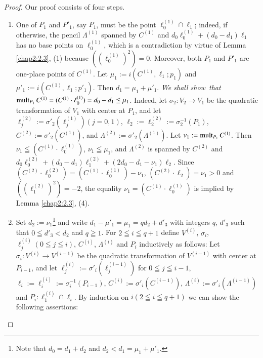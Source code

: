 \begin{proof}
Our proof consists of four steps.
\begin{enumerate}
\renewcommand{\theenumi}{\Roman{enumi}}
\renewcommand{\labelenumi}{\rm(\theenumi)}
\item One of $P_{1}$ and $P'_{1}$, say $P_{1}$, must be the point
  $\ell^{(1)}_{0}\cap \ell_{1}$; indeed, if otherwise, the pencil
  $\Lambda^{(1)}$ spanned by $C^{(1)}$ and
  $d_{0}\ell^{(1)}_{0}+(d_{0}-d_{1})\ell_{1}$ has no base points on
  $\ell^{(1)}_{0}$, which is a contradiction by virtue of Lemma
  \ref{chap2:2.3}, (1) because $((\ell^{(1)}_{0})^{2})=0$. Moreover, both
  $P_{1}$ and $P'_{1}$ are one-place points of $C^{(1)}$. Let
  $\mu_{1}:=i(C^{(1)},\ell_{1};p_{1})$ and
  $\mu'_{1}:=i(C^{(1)},\ell_{1};p'_{1})$. Then
  $d_{1}=\mu_{1}+\mu'_{1}$. {\em We shall show\pageoriginale\ that}
  $\operatorname{mult}_{P_{1}}C^{(1)}=(C^{(1)}\cdot\ell^{(1)}_{0})=d_{0}-d_{1}\leqq
  \mu_{1}$. Indeed, let $\sigma_{2}:V_{2}\to V_{1}$ be the quadratic
  transformation of $V_{1}$ with center at $P_{1}$, and let
  $\ell^{(2)}_{j}:=\sigma'_{2}(\ell^{(1)}_{j})(j=0,1)$,
  $\ell_{2}:=\ell^{(2)}_{2}:=\sigma^{-1}_{2}(P_{1})$,
  $C^{(2)}:=\sigma'_{2}(C^{(1)})$, and
  $\Lambda^{(2)}:=\sigma'_{2}(\Lambda^{(1)})$. Let
  $\nu_{1}:=\operatorname{mult}_{P_{1}}C^{(1)}$. Then $\nu_{1}\leqq
  (C^{(1)}\cdot\ell^{(1)}_{0})$, $\nu_{1}\leqq \mu_{1}$, and
  $\Lambda^{(2)}$ is spanned by $C^{(2)}$ and
  $d_{0}\ell_{0}^{(2)}+(d_{0}-d_{1})\ell^{(2)}_{1}+(2d_{0}-d_{1}-\nu_{1})\ell_{2}$. Since
  $(C^{(2)}\cdot \ell^{(2)}_{0})=(C^{(1)}\cdot
  \ell^{(1)}_{0})-\nu_{1}$, $(C^{(2)}\cdot\ell_{2})=\nu_{1}>0$ and
  $((\ell^{(2)}_{1})^{2})=-2$, the equality $\nu_{1}=(C^{(1)}\cdot
  \ell^{(1)}_{0})$ is implied by Lemma \ref{chap2:2.3}, (4).

\item Set $d_{2}:=\nu_{1}$\footnote{Note that $d_{0}=d_{1}+d_{2}$ and
  $d_{2}<d_{1}=\mu_{1}+\mu'_{1}$.} and write
  $d_{1}-\mu'_{1}=\mu_{1}=qd_{2}+d'_{3}$ with integers $q$, $d'_{3}$
  such that $0\leqq d'_{3}<d_{2}$ and $q\geqq 1$. For $2\leqq i\leqq
  q+1$ define $V^{(i)}$, $\sigma_{i}$, $\ell^{(i)}_{j}(0\leqq j\leqq
  i)$, $C^{(i)}$, $\Lambda^{(i)}$ and $P_{i}$ inductively as follows:
  Let $\sigma_{i}:V^{(i)}\to V^{(i-1)}$ be the quadratic
  transformation of $V^{(i-1)}$ with center at $P_{i-1}$, and let
  $\ell^{(i)}_{j}:=\sigma'_{i}(\ell^{(i-1)}_{j})$ for $0\leqq j\leqq
  i-1$, $\ell_{i}:=\ell^{(i)}_{i}:=\sigma^{-1}_{i}(P_{i-1})$,
  $C^{(i)}:=\sigma'_{i}(C^{(i-1)})$,
  $\Lambda^{(i)}:=\sigma'_{i}(\Lambda^{(i-1)})$ and
  $P_{i}:\ell^{(i)}_{1}\cap \ell_{i}$. By induction on $i(2\leqq
  i\leqq q+1)$ we can show the following assertions:


\end{enumerate}
\end{proof}
